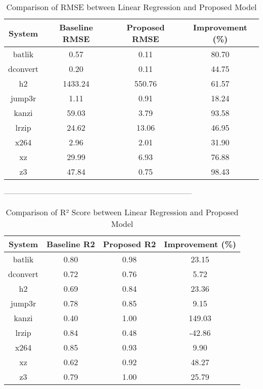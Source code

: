 \begin{table}[h]
    \centering
    \begin{tabular}{|c|c|c|c|}
        \hline
        System & Baseline RMSE & Proposed RMSE & Improvement (\%) \\
        \hline
        batlik & 0.57 & 0.11 & 80.70 \\
        dconvert & 0.20 & 0.11 & 44.75 \\
        h2 & 1433.24 & 550.76 & 61.57 \\
        jump3r & 1.11 & 0.91 & 18.24 \\
        kanzi & 59.03 & 3.79 & 93.58 \\
        lrzip & 24.62 & 13.06 & 46.95 \\
        x264 & 2.96 & 2.01 & 31.90 \\
        xz & 29.99 & 6.93 & 76.88 \\
        z3 & 47.84 & 0.75 & 98.43 \\
        \hline
    \end{tabular}
    \caption{Comparison of RMSE between Linear Regression and Proposed Model}
    \label{tab:rmse}
\end{table}
--------------------------------------------------------------------------------
\begin{table}[h]
    \centering
    \begin{tabular}{|c|c|c|c|}
        \hline
        System & Baseline R2 & Proposed R2 & Improvement (\%) \\
        \hline
        batlik & 0.80 & 0.98 & 23.15 \\
        dconvert & 0.72 & 0.76 & 5.72 \\
        h2 & 0.69 & 0.84 & 23.36 \\
        jump3r & 0.78 & 0.85 & 9.15 \\
        kanzi & 0.40 & 1.00 & 149.03 \\
        lrzip & 0.84 & 0.48 & -42.86 \\
        x264 & 0.85 & 0.93 & 9.90 \\
        xz & 0.62 & 0.92 & 48.27 \\
        z3 & 0.79 & 1.00 & 25.79 \\
        \hline
    \end{tabular}
    \caption{Comparison of R² Score between Linear Regression and Proposed Model}
    \label{tab:r2}
\end{table}